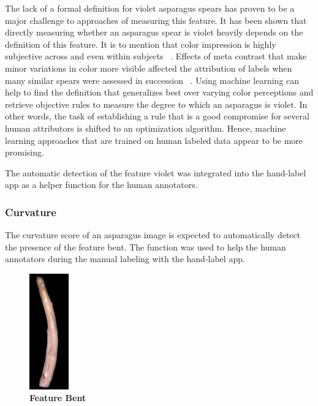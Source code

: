 \bigskip
The lack of a formal definition for violet asparagus spears has proven to be a major challenge to approaches of measuring this feature. It has been shown that directly measuring whether an asparagus spear is violet heavily depends on the definition of this feature. It is to mention that color impression is highly subjective across and even within subjects ~\citep{luo2000review}. Effects of meta contrast that make minor variations in color more visible affected the attribution of labels when many similar spears were assessed in succession ~\citep{reeves1981metacontrast}. Using machine learning can help to find the definition that generalizes best over varying color perceptions and retrieve objective rules to measure the degree to which an asparagus is violet. In other words, the task of establishing a rule that is a good compromise for several human attributors is shifted to an optimization algorithm. Hence, machine learning approaches that are trained on human labeled data appear to be more promising.

The automatic detection of the feature violet was integrated into the hand-label app as a helper function for the human annotators.


\subsubsection{Curvature}
\label{subsec:Curvature}

The curvature score of an asparagus image is expected to automatically detect the presence of the feature bent. The function was used to help the human annotators during the manual labeling with the hand-label app.

\begin{figure}
  \begin{center}
    \includegraphics[width=0.15\textwidth]{Figures/chapter03/example_img_bent.png}
  \end{center}
  \vspace{-15pt}
  \caption[Example Image Feature Bent]{ \textbf{Feature Bent}~~~~~~~~}
  \label{fig:ExampleBent}
\end{figure}

